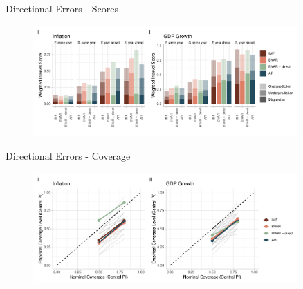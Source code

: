 \documentclass[en]{sdqbeamer}
\begin{document}
\appendix
\beginbackup
\begin{frame}{Directional Errors - Scores}
\label{errorextraction}
\begin{figure}
        \centering
        \includegraphics[width=0.9\textwidth]{figures/wis_cpigdp_new_directional.pdf}
    \end{figure}
\end{frame}
\begin{frame}{Directional Errors - Coverage}
\begin{figure}
        \centering
        \includegraphics[width=0.9\textwidth]{figures/coverage_directional.pdf}
    \end{figure}
\end{frame}
\end{document}
